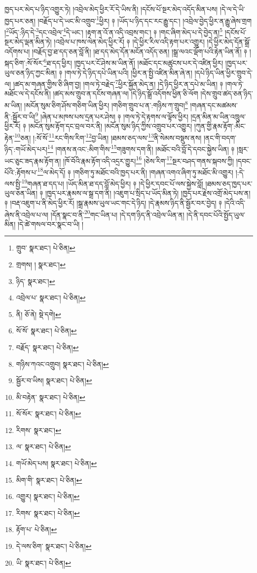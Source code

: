 ཁྱད་པར་མེད་པ་ཉིད་འགྱུར་ཏེ། །འབྲེལ་མེད་ཕྱིར་རོ་དེ་ཡིས་ནི། །དངོས་པོ་སྔར་མེད་འདོད་མིན་པས། །དེ་ལ་དེ་ཡི་ཁྱད་པར་ཅན། །བརྗོད་པ་དེ་ཡང་མི་འགྲུབ་\footnote{གྲུབ་  སྣར་ཐང་།  པེ་ཅིན། }ཕྱིར། ༈ །ཡོད་པ་ཉིད་དང་རང་རྒྱུ་དང་། །འབྲེལ་བྱེད་ཕྱིར་ན་རྒྱུ་ཞེས་གྲག །\footnote{གྲགས། །  སྣར་ཐང་། }ཡོད་:ཉིད་དེ་\footnote{ཉིད་  སྣར་ཐང་། }དང་འབྲེལ་\footnote{འབྲེལ་པ་  སྣར་ཐང་།  པེ་ཅིན། }དེ་ཡང་། །རྟག་ན་འོ་ན་འདི་འབྲས་གང་། ༈ །གང་ཞིག་མེད་པ་དེ་བྱེད་ན།\footnote{ནི།  ཅོ་ནེ།  སྡེ་དགེ། } །དངོས་པོ་སྔར་མེད་ལྡན་མིན་ཏེ། །འབྲེལ་པ་ཁས་ལེན་མེད་ཕྱིར་རོ། ༈ །དེ་ཕྱིར་རིལ་འདི་རྟག་པར་འགྱུར། །དེ་ཕྱིར་མེད་དོན་སྒྲོ་འདོགས་པ། །བརྗོད་བྱ་ཐ་དད་ཅན་བློ་ནི། །ཐ་དད་མེད་དོན་མངོན་འདོད་ཅན། །སྒྲ་ལའང་ལྡོག་པའི་རྟེན་ཡིན་ནོ། ༈ །སྐད་ཅིག་:སོ་སོར་\footnote{སོ་སོ་  སྣར་ཐང་།  པེ་ཅིན། }ཐ་དད་ཕྱིར། །ཁྱད་པར་ངོ་ཤེས་མ་ཡིན་ནོ། །མཐོང་དང་མཚུངས་པར་དེ་འཛིན་ཕྱིར། །ཁྱད་པར་ཡུལ་ཅན་ཉིད་ཀྱང་མིན། ༈ །གལ་ཏེ་དེ་ཉིད་དཔེ་ཡིན་པའི། །ཕྱིར་ན་སྤྱི་འཛིན་མིན་ཞེ་ན། །དཔེ་ཉིད་ཡིན་ཕྱིར་གྲུབ་དེ་ལ། །ཚད་མ་གཞན་གྱིས་ཅི་ཞིག་བྱ། །གལ་ཏེ་བརྗེད་\footnote{བརྗོད་  སྣར་ཐང་།  པེ་ཅིན། }ཕྱིར་སྐྱོན་མེད་ན། །དེ་ཉིད་ཕྱིར་ན་དཔེ་མ་ཡིན། ༈ །གལ་ཏེ་མཐོང་ལ་དེ་དངོས་ནི། །ཚད་མས་གྲུབ་ན་དངོས་གཞན་ལ། །དེ་ཉིད་སྒྲོ་འདོགས་ཕྱིན་ཅི་ལོག །དེས་གྲུབ་ཚད་ཅན་ཉིད་མ་ཡིན། །མངོན་སུམ་ཅིག་ཤོས་གཅིག་ཡིན་ཕྱིར། །གཅིག་གྲུབ་པ་ན་:གཉིས་ཀ་གྲུབ།\footnote{གཉིས་ཀའང་འགྲུབ།  སྣར་ཐང་།  པེ་ཅིན། } །གཞན་དང་མཚམས་ནི་:སྦྱོར་བ་ཡི།\footnote{སྦྱོར་བ་ཡིས།  སྣར་ཐང་།  པེ་ཅིན། } །ཞེན་པ་མཁས་པས་དྲན་པར་ཤེས། ༈ །གལ་ཏེ་དེ་རྟགས་ལ་ལྟོས་ཕྱིར། །དྲན་མིན་མ་ཡིན་འཁྲུལ་ཕྱིར་རོ། ༈ །མངོན་སུམ་རྟོག་དང་བྲལ་བར་ནི། །མངོན་སུམ་ཉིད་ཀྱིས་འགྲུབ་པར་འགྱུར། །ཀུན་གྱི་རྣམ་རྟོག་:མིང་རྟེན་\footnote{མི་བརྟེན་  སྣར་ཐང་།  པེ་ཅིན། }ཅན། །:སོ་སོ་\footnote{སོ་སོར་  སྣར་ཐང་།  པེ་ཅིན། }རང་གིས་རིག་\footnote{རིགས་  སྣར་ཐང་། }བྱ་ཡིན། །ཐམས་ཅད་ལས་\footnote{ལ་  སྣར་ཐང་།  པེ་ཅིན། }ནི་སེམས་བསྡུས་ནས། །ནང་གི་བདག་ཉིད་:གཡོ་མེད་པར།\footnote{གཡོ་མེད་པས།  སྣར་ཐང་།  པེ་ཅིན། } །གནས་ནའང་:མིག་གིས་\footnote{མིག་གི་  སྣར་ཐང་།  པེ་ཅིན། }གཟུགས་དག་ནི། །མཐོང་བའི་བློ་དེ་དབང་སྐྱེས་ཡིན། ༈ །སླར་ཡང་ཅུང་ཟད་རྣམ་རྟོག་ན། །ཁོ་བོའི་རྣམ་རྟོག་འདི་འདྲར་གྱུར།\footnote{འགྱུར།  སྣར་ཐང་།  པེ་ཅིན། } །ཅེས་རིག་\footnote{རིགས་  སྣར་ཐང་།  པེ་ཅིན། }སྔར་བཤད་གནས་སྐབས་ཀྱི། །དབང་པོའི་:རྟོགས་པ་\footnote{རྟོག་པ་  པེ་ཅིན། }ལ་མེད་དོ། ༈ །གཅིག་ཏུ་མཐོང་བའི་ཁྱད་པར་ནི། །གཞན་འགའ་ཞིག་ཏུ་མཐོང་མི་འགྱུར། །:དེ་ལས་སྤྱི་\footnote{དེ་ལས་ཅིག་  སྣར་ཐང་།  པེ་ཅིན། }གཞན་ཐ་དད་པ། །ཡོད་མིན་ཐ་དད་བློ་མེད་ཕྱིར། ༈ །དེ་ཕྱིར་དབང་པོ་ལས་སྐྱེས་བློ། །ཐམས་ཅད་ཁྱད་པར་ཡུལ་ཅན་ཡིན། ༈ །ཁྱད་པར་རྣམས་ལ་སྒྲ་དག་ནི། །འཇུག་པ་སྲིད་པ་ཡོད་མིན་ཏེ། །ཁྱད་པར་རྗེས་འགྲོ་མེད་པས་ན། ༈ །བརྡ་འཇུག་པ་ནི་མེད་ཕྱིར་རོ། །སྒྲ་རྣམས་ཡུལ་ཡང་གང་དེ་ཉིད། །དེ་རྣམས་ཉིད་ནི་སྦྱོར་བར་བྱེད། ༈ །དེའི་འདི་ཞེས་ནི་འབྲེལ་པ་ལ། །དོན་སྣང་བ་ནི་\footnote{ཡི་  སྣར་ཐང་།  པེ་ཅིན། }གང་ཡིན་པ། །དེ་དག་ཉིད་ནི་འབྲེལ་ཡིན་ན། །དེ་ནི་དབང་པོའི་སྤྱོད་ཡུལ་མིན། །དེ་ཚེ་གསལ་བར་སྣང་བ་ཡི། །
